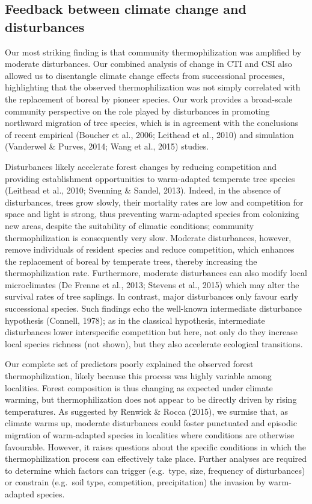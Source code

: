 \documentclass[
  a4paperpaper,
]{article}
\begin{document}
\hypertarget{feedback-between-climate-change-and-disturbances}{%
\subsection{Feedback between climate change and
disturbances}\label{feedback-between-climate-change-and-disturbances}}

Our most striking finding is that community thermophilization was
amplified by moderate disturbances. Our combined analysis of change in
CTI and CSI also allowed us to disentangle climate change effects from
successional processes, highlighting that the observed thermophilization
was not simply correlated with the replacement of boreal by pioneer
species. Our work provides a broad-scale community perspective on the
role played by disturbances in promoting northward migration of tree
species, which is in agreement with the conclusions of recent empirical
(Boucher et al., 2006; Leithead et al., 2010) and simulation (Vanderwel
\& Purves, 2014; Wang et al., 2015) studies.

Disturbances likely accelerate forest changes by reducing competition
and providing establishment opportunities to warm-adapted temperate tree
species (Leithead et al., 2010; Svenning \& Sandel, 2013). Indeed, in
the absence of disturbances, trees grow slowly, their mortality rates
are low and competition for space and light is strong, thus preventing
warm-adapted species from colonizing new areas, despite the suitability
of climatic conditions; community thermophilization is consequently very
slow. Moderate disturbances, however, remove individuals of resident
species and reduce competition, which enhances the replacement of boreal
by temperate trees, thereby increasing the thermophilization rate.
Furthermore, moderate disturbances can also modify local microclimates
(De Frenne et al., 2013; Stevens et al., 2015) which may alter the
survival rates of tree saplings. In contrast, major disturbances only
favour early successional species. Such findings echo the well-known
intermediate disturbance hypothesis (Connell, 1978); as in the classical
hypothesis, intermediate disturbances lower interspecific competition
but here, not only do they increase local species richness (not shown),
but they also accelerate ecological transitions.

Our complete set of predictors poorly explained the observed forest
thermophilization, likely because this process was highly variable among
localities. Forest composition is thus changing as expected under
climate warming, but thermophilization does not appear to be directly
driven by rising temperatures. As suggested by Renwick \& Rocca (2015),
we surmise that, as climate warms up, moderate disturbances could foster
punctuated and episodic migration of warm-adapted species in localities
where conditions are otherwise favourable. However, it raises questions
about the specific conditions in which the thermophilization process can
effectively take place. Further analyses are required to determine which
factors can trigger (e.g.~type, size, frequency of disturbances) or
constrain (e.g.~soil type, competition, precipitation) the invasion by
warm-adapted species.
\end{document}
